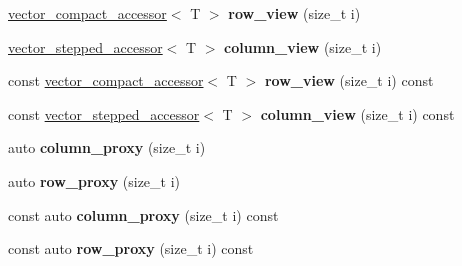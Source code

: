 \begin{DoxyCompactItemize}
\item 
\hyperlink{classmalgo_1_1vector__compact__accessor}{vector\+\_\+compact\+\_\+accessor}$<$ T $>$ {\bfseries row\+\_\+view} (size\+\_\+t i)\hypertarget{classmalgo_1_1matrix__compact__basic_a2b95c3c6d53463a662359ba4874e2b6e}{}\label{classmalgo_1_1matrix__compact__basic_a2b95c3c6d53463a662359ba4874e2b6e}

\item 
\hyperlink{classmalgo_1_1vector__stepped__accessor}{vector\+\_\+stepped\+\_\+accessor}$<$ T $>$ {\bfseries column\+\_\+view} (size\+\_\+t i)\hypertarget{classmalgo_1_1matrix__compact__basic_a687053749183d90c77430b5df1e3e013}{}\label{classmalgo_1_1matrix__compact__basic_a687053749183d90c77430b5df1e3e013}

\item 
const \hyperlink{classmalgo_1_1vector__compact__accessor}{vector\+\_\+compact\+\_\+accessor}$<$ T $>$ {\bfseries row\+\_\+view} (size\+\_\+t i) const \hypertarget{classmalgo_1_1matrix__compact__basic_a510742f7c7210a16f76aaef1a6eb1395}{}\label{classmalgo_1_1matrix__compact__basic_a510742f7c7210a16f76aaef1a6eb1395}

\item 
const \hyperlink{classmalgo_1_1vector__stepped__accessor}{vector\+\_\+stepped\+\_\+accessor}$<$ T $>$ {\bfseries column\+\_\+view} (size\+\_\+t i) const \hypertarget{classmalgo_1_1matrix__compact__basic_ae16cddfd7861ea4b70102c84664fb95e}{}\label{classmalgo_1_1matrix__compact__basic_ae16cddfd7861ea4b70102c84664fb95e}

\item 
auto {\bfseries column\+\_\+proxy} (size\+\_\+t i)\hypertarget{classmalgo_1_1matrix__compact__basic_a1c27a068ec295d9bdc39221a2566633f}{}\label{classmalgo_1_1matrix__compact__basic_a1c27a068ec295d9bdc39221a2566633f}

\item 
auto {\bfseries row\+\_\+proxy} (size\+\_\+t i)\hypertarget{classmalgo_1_1matrix__compact__basic_a763bf2e0082862ed87694c3163b408fd}{}\label{classmalgo_1_1matrix__compact__basic_a763bf2e0082862ed87694c3163b408fd}

\item 
const auto {\bfseries column\+\_\+proxy} (size\+\_\+t i) const \hypertarget{classmalgo_1_1matrix__compact__basic_a3445735fd9b80f32f3901ef4ac52ab75}{}\label{classmalgo_1_1matrix__compact__basic_a3445735fd9b80f32f3901ef4ac52ab75}

\item 
const auto {\bfseries row\+\_\+proxy} (size\+\_\+t i) const \hypertarget{classmalgo_1_1matrix__compact__basic_ad610e9e7e9e33c6556be4e3840528474}{}\label{classmalgo_1_1matrix__compact__basic_ad610e9e7e9e33c6556be4e3840528474}


\end{DoxyCompactItemize}
